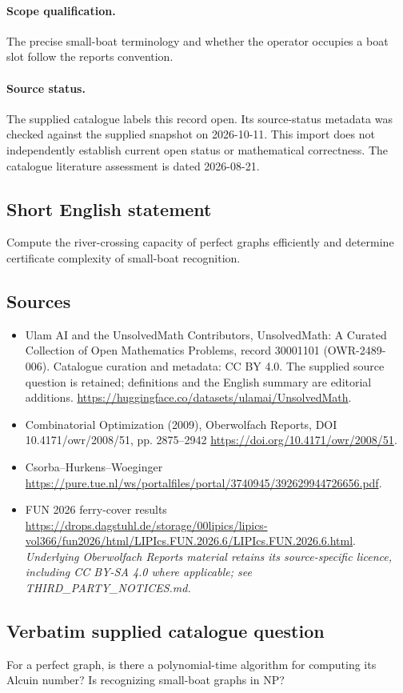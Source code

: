 \documentclass[11pt]{article}
\begin{document}
\paragraph{Scope qualification.}
The precise small-boat terminology and whether the operator occupies a boat slot follow the report\textquotesingle s convention.
\paragraph{Source status.}
The supplied catalogue labels this record open. Its source-status metadata was checked against the supplied snapshot on 2026-10-11. This import does not independently establish current open status or mathematical correctness. The catalogue literature assessment is dated 2026-08-21.
\subsection{Short English statement}
Compute the river-crossing capacity of perfect graphs efficiently and determine certificate complexity of small-boat recognition.
\subsection{Sources}
\begin{itemize}
\item[S1] Ulam AI and the UnsolvedMath Contributors, UnsolvedMath: A Curated Collection of Open Mathematics Problems, record 30001101 (OWR-2489-006). Catalogue curation and metadata: CC BY 4.0. The supplied source question is retained; definitions and the English summary are editorial additions.
\url{https://huggingface.co/datasets/ulamai/UnsolvedMath}.
\item[S2] Combinatorial Optimization (2009), Oberwolfach Reports, DOI 10.4171/owr/2008/51, pp. 2875--2942
\url{https://doi.org/10.4171/owr/2008/51}.
\item[S3] Csorba--Hurkens--Woeginger
\url{https://pure.tue.nl/ws/portalfiles/portal/3740945/392629944726656.pdf}.
\item[S4] FUN 2026 ferry-cover results
\url{https://drops.dagstuhl.de/storage/00lipics/lipics-vol366/fun2026/html/LIPIcs.FUN.2026.6/LIPIcs.FUN.2026.6.html}.
\textit{Underlying Oberwolfach Reports material retains its source-specific licence, including CC BY-SA 4.0 where applicable; see THIRD\_PARTY\_NOTICES.md.}
\end{itemize}
\subsection{Verbatim supplied catalogue question}
For a perfect graph, is there a polynomial-time algorithm for computing its Alcuin number? Is recognizing small-boat graphs in NP?
\end{document}
